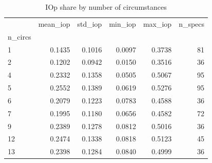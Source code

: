 \begin{table}
\caption{IOp share by number of circumstances}
\label{tab:by_circumstances}
\begin{tabular}{lrrrrr}
\toprule
 & mean_iop & std_iop & min_iop & max_iop & n_specs \\
n_circs &  &  &  &  &  \\
\midrule
1 & 0.1435 & 0.1016 & 0.0097 & 0.3738 & 81 \\
2 & 0.1202 & 0.0942 & 0.0150 & 0.3516 & 36 \\
4 & 0.2332 & 0.1358 & 0.0505 & 0.5067 & 95 \\
5 & 0.2552 & 0.1389 & 0.0619 & 0.5276 & 95 \\
6 & 0.2079 & 0.1223 & 0.0783 & 0.4588 & 36 \\
7 & 0.1995 & 0.1180 & 0.0656 & 0.4582 & 72 \\
9 & 0.2389 & 0.1278 & 0.0812 & 0.5016 & 36 \\
12 & 0.2474 & 0.1338 & 0.0818 & 0.5123 & 45 \\
13 & 0.2398 & 0.1284 & 0.0840 & 0.4999 & 36 \\
\bottomrule
\end{tabular}
\end{table}
